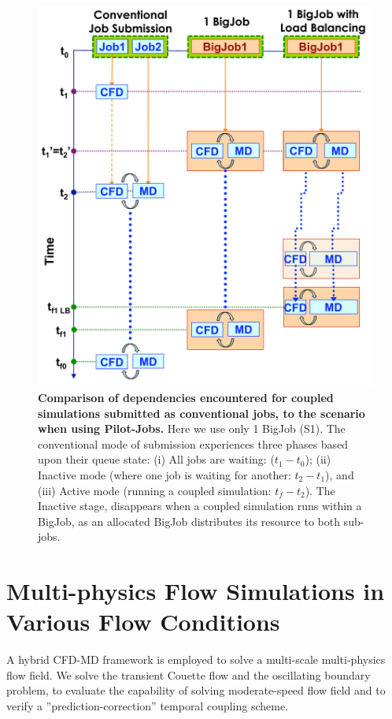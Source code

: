 \documentclass[preprint,12pt]{elsarticle}
\begin{document}
\begin{figure}
\centering
\includegraphics[width=0.8\linewidth]{Single_BigJob_Scenarios_new.pdf}
\caption{\small {\bf Comparison of dependencies encountered for coupled
  simulations submitted as conventional jobs, to the scenario when
  using Pilot-Jobs.} Here we use only 1 BigJob (S1). The conventional
  mode of submission experiences three phases based upon their queue
  state: (i) All jobs are waiting: ($t_1-t_0$); (ii) Inactive mode
  (where one job is waiting for another: $t_2-t_1$), and (iii) Active
  mode (running a coupled simulation: $t_f-t_2$). The Inactive stage,
  disappears when a coupled simulation runs within a BigJob, as an
  allocated BigJob distributes its resource to both sub-jobs.}
\label{Fig:OneBJ_Flow}
\vspace{-1em}
\end{figure}



\section{Multi-physics Flow Simulations in Various Flow Conditions}
\label{sec:accuracy}
A hybrid CFD-MD framework is employed to solve a multi-scale multi-physics flow field. We solve the transient Couette flow and the oscillating boundary problem, to evaluate the capability of solving moderate-speed flow field and to verify a ''prediction-correction'' temporal coupling scheme.
\end{document}
